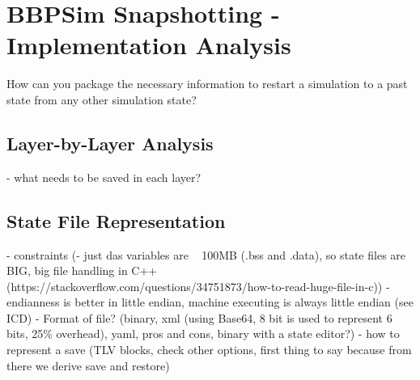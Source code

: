 {
\setlength{\parindent}{2em}
\chapter{BBPSim Snapshotting - Implementation Analysis}\label{cha:bbpsim-impl}
How can you package the necessary information to restart a simulation to a past state from any other simulation state? 
\section{Layer-by-Layer Analysis}
- what needs to be saved in each layer?
\section{State File Representation}
- constraints (- just das variables are ~ 100MB (.bss and .data), so state files are BIG, big file handling in C++ (https://stackoverflow.com/questions/34751873/how-to-read-huge-file-in-c))
- endianness is better in little endian, machine executing is always little endian (see ICD)
- Format of file? (binary, xml (using Base64, 8 bit is used to represent 6 bits, 25\% overhead), yaml, pros and cons, binary with a state editor?)
- how to represent a save (TLV blocks, check other options, first thing to say because from there we derive save and restore)

}
